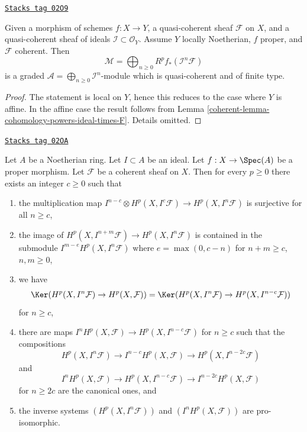 \begin{lemma}
\label{coherent-lemma-cohomology-powers-ideal-times-sheaf}
\href{https://stacks.math.columbia.edu/tag/02O9}{\texttt{Stacks tag 02O9}}

Given a morphism of schemes $f : X \to Y$, a quasi-coherent sheaf
$\mathcal{F}$ on $X$, and a quasi-coherent sheaf of ideals
$\mathcal{I} \subset \mathcal{O}_Y$. Assume $Y$ locally
Noetherian, $f$ proper, and $\mathcal{F}$ coherent.
Then
$$
\mathcal{M} =
\bigoplus\nolimits_{n \geq 0} R^pf_*(\mathcal{I}^n\mathcal{F})
$$
is a graded $\mathcal{A} = \bigoplus_{n \geq 0} \mathcal{I}^n$-module
which is quasi-coherent and of finite type.
\end{lemma}

\begin{proof}

The statement is local on $Y$, hence this reduces to the
case where $Y$ is affine. In the affine case the result follows
from Lemma \ref{coherent-lemma-cohomology-powers-ideal-times-F}.
Details omitted.
\end{proof}

\begin{lemma}
\label{coherent-lemma-cohomology-powers-ideal-application}
\href{https://stacks.math.columbia.edu/tag/02OA}{\texttt{Stacks tag 02OA}}

Let $A$ be a Noetherian ring.
Let $I \subset A$ be an ideal.
Let $f : X \to \Spec(A)$ be a proper morphism.
Let $\mathcal{F}$ be a coherent sheaf on $X$.
Then for every $p \geq 0$ there exists an integer $c \geq 0$
such that
\begin{enumerate}
\item the multiplication map
$I^{n - c} \otimes H^p(X, I^c\mathcal{F}) \to H^p(X, I^n\mathcal{F})$
is surjective for all $n \geq c$,
\item the image of $H^p(X, I^{n + m}\mathcal{F}) \to H^p(X, I^n\mathcal{F})$
is contained in the submodule $I^{m - e} H^p(X, I^n\mathcal{F})$
where $e = \max(0, c - n)$ for $n + m \geq c$, $n, m \geq 0$,
\item we have
$$
\Ker(H^p(X, I^n\mathcal{F}) \to H^p(X, \mathcal{F})) =
\Ker(H^p(X, I^n\mathcal{F}) \to H^p(X, I^{n - c}\mathcal{F}))
$$
for $n \geq c$,
\item there are maps $I^nH^p(X, \mathcal{F}) \to H^p(X, I^{n - c}\mathcal{F})$
for $n \geq c$ such that the compositions
$$
H^p(X, I^n\mathcal{F}) \to
I^{n - c}H^p(X, \mathcal{F}) \to
H^p(X, I^{n - 2c}\mathcal{F})
$$
and
$$
I^nH^p(X, \mathcal{F}) \to
H^p(X, I^{n - c}\mathcal{F}) \to
I^{n - 2c}H^p(X, \mathcal{F})
$$
for $n \geq 2c$ are the canonical ones, and
\item the inverse systems $(H^p(X, I^n\mathcal{F}))$ and
$(I^nH^p(X, \mathcal{F}))$ are pro-isomorphic.
\end{enumerate}
\end{lemma}

